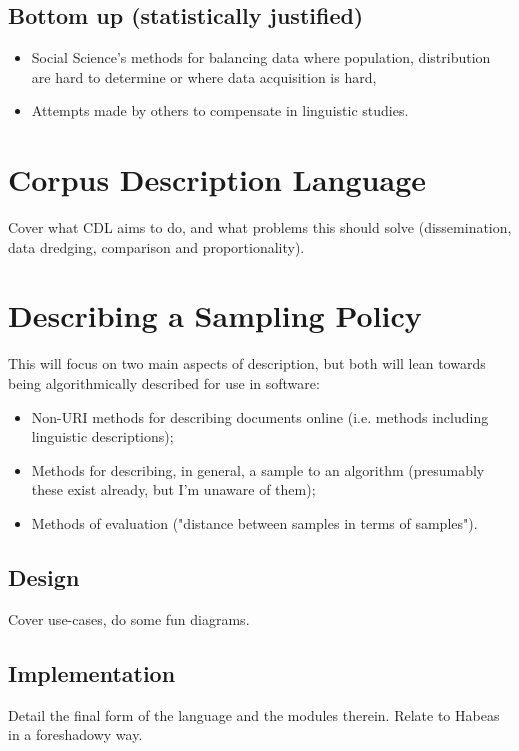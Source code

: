 \subsection{Bottom up (statistically justified)}
\begin{itemize}
	\item Social Science's methods for balancing data where population, distribution are hard to determine or where data acquisition is hard,
	\item Attempts made by others to compensate in linguistic studies.
\end{itemize}







\section{Corpus Description Language}
Cover what CDL aims to do, and what problems this should solve (dissemination, data dredging, comparison and proportionality).


\section{Describing a Sampling Policy}
This will focus on two main aspects of description, but both will lean towards being algorithmically described for use in software:
\begin{itemize}
	\item Non-URI methods for describing documents online (i.e. methods including linguistic descriptions);
	\item Methods for describing, in general, a sample to an algorithm (presumably these exist already, but I'm unaware of them);
	\item Methods of evaluation ("distance between samples in terms of samples").
\end{itemize}




\subsection{Design}
Cover use-cases, do some fun diagrams.


\subsection{Implementation}
Detail the final form of the language and the modules therein.  Relate to Habeas in a foreshadowy way.



